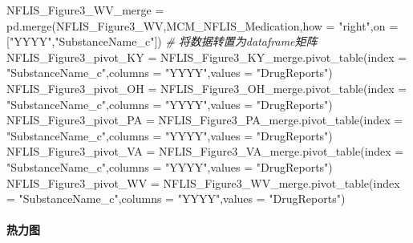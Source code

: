 \documentclass[
]{article}
\newenvironment{Shaded}{}{}
\newcommand{\CommentTok}[1]{\textcolor[rgb]{0.38,0.63,0.69}{\textit{#1}}}
\newcommand{\NormalTok}[1]{#1}
\newcommand{\OperatorTok}[1]{\textcolor[rgb]{0.40,0.40,0.40}{#1}}
\newcommand{\StringTok}[1]{\textcolor[rgb]{0.25,0.44,0.63}{#1}}
\begin{document}
\begin{Shaded}
\begin{Highlighting}[]
\NormalTok{NFLIS\_Figure3\_WV\_merge }\OperatorTok{=}\NormalTok{ pd.merge(NFLIS\_Figure3\_WV,MCM\_NFLIS\_Medication,how }\OperatorTok{=} \StringTok{"right"}\NormalTok{,on }\OperatorTok{=}\NormalTok{ [}\StringTok{"YYYY"}\NormalTok{,}\StringTok{"SubstanceName\_c"}\NormalTok{])}
\CommentTok{\# 将数据转置为dataframe矩阵}
\NormalTok{NFLIS\_Figure3\_pivot\_KY }\OperatorTok{=}\NormalTok{ NFLIS\_Figure3\_KY\_merge.pivot\_table(index }\OperatorTok{=} \StringTok{"SubstanceName\_c"}\NormalTok{,columns }\OperatorTok{=} \StringTok{"YYYY"}\NormalTok{,values }\OperatorTok{=} \StringTok{"DrugReports"}\NormalTok{)}
\NormalTok{NFLIS\_Figure3\_pivot\_OH }\OperatorTok{=}\NormalTok{ NFLIS\_Figure3\_OH\_merge.pivot\_table(index }\OperatorTok{=} \StringTok{"SubstanceName\_c"}\NormalTok{,columns }\OperatorTok{=} \StringTok{"YYYY"}\NormalTok{,values }\OperatorTok{=} \StringTok{"DrugReports"}\NormalTok{)}
\NormalTok{NFLIS\_Figure3\_pivot\_PA }\OperatorTok{=}\NormalTok{ NFLIS\_Figure3\_PA\_merge.pivot\_table(index }\OperatorTok{=} \StringTok{"SubstanceName\_c"}\NormalTok{,columns }\OperatorTok{=} \StringTok{"YYYY"}\NormalTok{,values }\OperatorTok{=} \StringTok{"DrugReports"}\NormalTok{)}
\NormalTok{NFLIS\_Figure3\_pivot\_VA }\OperatorTok{=}\NormalTok{ NFLIS\_Figure3\_VA\_merge.pivot\_table(index }\OperatorTok{=} \StringTok{"SubstanceName\_c"}\NormalTok{,columns }\OperatorTok{=} \StringTok{"YYYY"}\NormalTok{,values }\OperatorTok{=} \StringTok{"DrugReports"}\NormalTok{)}
\NormalTok{NFLIS\_Figure3\_pivot\_WV }\OperatorTok{=}\NormalTok{ NFLIS\_Figure3\_WV\_merge.pivot\_table(index }\OperatorTok{=} \StringTok{"SubstanceName\_c"}\NormalTok{,columns }\OperatorTok{=} \StringTok{"YYYY"}\NormalTok{,values }\OperatorTok{=} \StringTok{"DrugReports"}\NormalTok{)}
\end{Highlighting}
\end{Shaded}

\hypertarget{header-n245}{%
\paragraph{热力图}\label{header-n245}}
\end{document}
